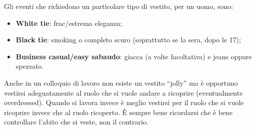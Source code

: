Gli eventi che richiedono un particolare tipo di vestito, per un uomo, sono:
\begin{itemize}
\item \textbf{White tie}: frac/estrema eleganza;
\item \textbf{Black tie}: smoking o completo scuro (soprattutto se la sera,
 dopo le 17);
\item \textbf{Business casual/easy sabaudo}:
 giacca (a volte facoltativa) e jeans oppure spezzato.
\end{itemize}

Anche in un colloquio di lavoro non esiste un vestito ``jolly'' ma è opportuno
vestirsi adeguatamente al ruolo che si vuole andare a ricoprire (eventualmente
overdressed). Quando si lavora invece è meglio vestirsi per il ruolo che si
vuole ricoprire invece che al ruolo ricoperto. È sempre bene
ricordarsi che è bene controllare l'abito che si veste, non il contrario.
